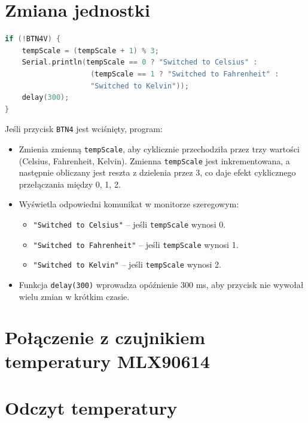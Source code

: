 \section*{Zmiana jednostki}
\begin{lstlisting}[language=C++]
if (!BTN4V) {
    tempScale = (tempScale + 1) % 3;
    Serial.println(tempScale == 0 ? "Switched to Celsius" : 
                    (tempScale == 1 ? "Switched to Fahrenheit" : 
                    "Switched to Kelvin"));
    delay(300);
}
\end{lstlisting}
Jeśli przycisk \texttt{BTN4} jest wciśnięty, program:
\begin{itemize}
    \item Zmienia zmienną \texttt{tempScale}, aby cyklicznie przechodziła przez trzy wartości (Celsius, Fahrenheit, Kelvin). Zmienna \texttt{tempScale} jest inkrementowana, a następnie obliczany jest reszta z dzielenia przez 3, co daje efekt cyklicznego przełączania między 0, 1, 2.
    \item Wyświetla odpowiedni komunikat w monitorze szeregowym:
    \begin{itemize}
        \item \texttt{"Switched to Celsius"} – jeśli \texttt{tempScale} wynosi 0.
        \item \texttt{"Switched to Fahrenheit"} – jeśli \texttt{tempScale} wynosi 1.
        \item \texttt{"Switched to Kelvin"} – jeśli \texttt{tempScale} wynosi 2.
    \end{itemize}
    \item Funkcja \texttt{delay(300)} wprowadza opóźnienie 300 ms, aby przycisk nie wywołał wielu zmian w krótkim czasie.
\end{itemize}





\section{Połączenie z czujnikiem temperatury MLX90614}

\section*{Odczyt temperatury}

